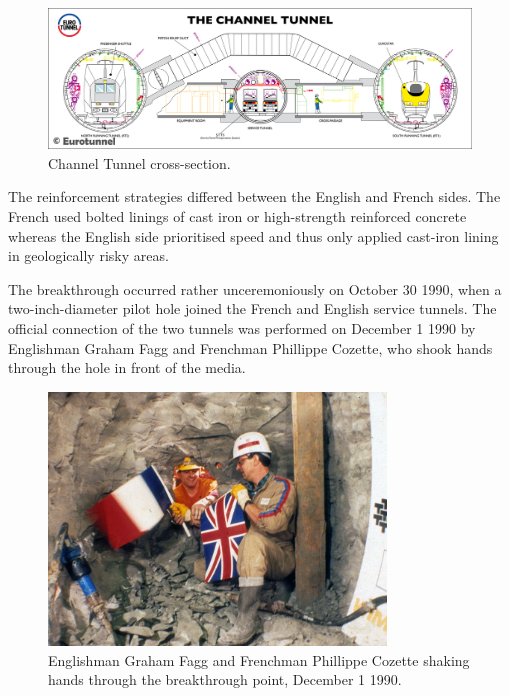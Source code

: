\documentclass[12pt]{article} %
\begin{document}
\begin{figure}[hp]
  \centering
  \includegraphics[width=\textwidth]{tunnelcross}
  \caption{Channel Tunnel cross-section.}
  \label{fig:cross}
\end{figure}

The reinforcement strategies differed between the English and French sides. The French used bolted linings of cast iron or high-strength reinforced concrete whereas the English side prioritised speed and thus only applied cast-iron lining in geologically risky areas.

The breakthrough occurred rather unceremoniously on October 30 1990, when a two-inch-diameter pilot hole joined the French and English service tunnels. The official connection of the two tunnels was performed on December 1 1990 by Englishman Graham Fagg and Frenchman Phillippe Cozette, who shook hands through the hole in front of the media.

\begin{figure}[hp]
  \centering
  \includegraphics[width=0.8\textwidth]{breakthrough}
  \caption{Englishman Graham Fagg and Frenchman Phillippe Cozette shaking hands through the breakthrough point, December 1 1990.}
  \label{fig:break}
\end{figure}
\end{document}
